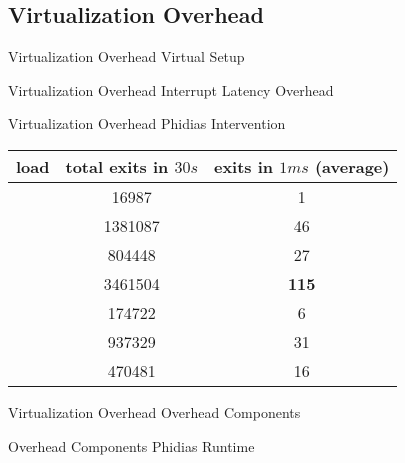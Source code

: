 \documentclass[10pt,hyperref={hyperfootnotes=false}, xcolor={usenames, dvipsnames}]{beamer}
\begin{document}
\subsection{Virtualization Overhead}
\begin{frame}{Virtualization Overhead} {Virtual Setup}
  	\begingroup
	
	\endgroup
\end{frame}

\begin{frame}[allowframebreaks]{Virtualization Overhead} {Interrupt Latency Overhead}
	
\end{frame}

\begin{frame}{Virtualization Overhead} {Phidias Intervention}

	\begin{table}[H]
	\centering
	\begin{tabular}{|r|c|c|}  
	\hline
    \textbf{load}	&	\textbf{total exits in $30s$}	&	\textbf{exits in $1ms$} (average) \\ \hline
	\mcachepressure{}	&		16987	&	1 	\\ \hline
	\mforkops{}	&			1381087	&	46 		\\ \hline
	\mfileops{}	&			804448	&	27 		\\ \hline
	\mhackbench{}	&		3461504	&	\textbf{115} \\ \hline
	\mmmapops{}	&			174722	&	6		 \\ \hline
	\mstdout{}	&			937329	&	31 		\\ \hline
	\mthreadops{}	&		470481	&	16 		\\ \hline
	\end{tabular}
	\end{table}
\end{frame}

\begin{frame} {Virtualization Overhead} {Overhead Components}
    \begingroup
	
	\endgroup
\end{frame}

\begin{frame}[allowframebreaks] {Overhead Components} {Phidias Runtime}
    \begingroup
	
	\endgroup
\end{frame}
\end{document}
